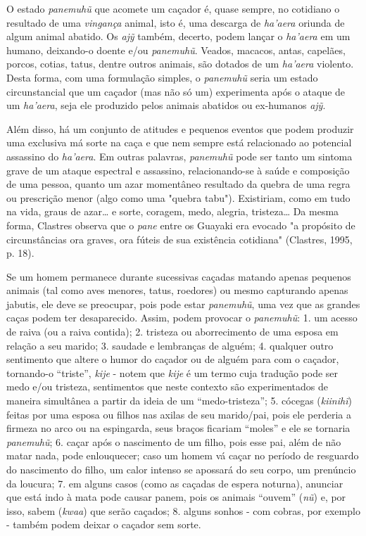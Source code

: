O estado \emph{panemuhũ} que acomete um caçador é, quase sempre, no
cotidiano o resultado de uma \emph{vingança} animal, isto é, uma
descarga de \emph{ha'aera} oriunda de algum animal abatido. Os
\emph{ajỹ} também, decerto, podem lançar o \emph{ha'aera} em um humano,
deixando-o doente e/ou \emph{panemuhũ}. Veados, macacos, antas,
capelães, porcos, cotias, tatus, dentre outros animais, são dotados de
um \emph{ha'aera} violento. Desta forma, com uma formulação simples, o
\emph{panemuhũ} seria um estado circunstancial que um caçador (mas não
só um) experimenta após o ataque de um \emph{ha'aera}, seja ele
produzido pelos animais abatidos ou ex-humanos \emph{ajỹ}.

Além disso, há um conjunto de atitudes e pequenos eventos que podem
produzir uma exclusiva má sorte na caça e que nem sempre está
relacionado ao potencial assassino do \emph{ha'aera}. Em outras
palavras, \emph{panemuhũ} pode ser tanto um sintoma grave de um ataque
espectral e assassino, relacionando-se à saúde e composição de uma
pessoa, quanto um azar momentâneo resultado da quebra de uma regra ou
prescrição menor (algo como uma "quebra tabu"). Existiriam, como em tudo
na vida, graus de azar\ldots{} e sorte, coragem, medo, alegria, tristeza\ldots{}
Da mesma forma, Clastres observa que o \emph{pane} entre os Guayaki era
evocado "a propósito de circunstâncias ora graves, ora fúteis de sua
existência cotidiana" (Clastres, 1995, p. 18).

Se um homem permanece durante sucessivas caçadas matando apenas pequenos
animais (tal como aves menores, tatus, roedores) ou mesmo capturando
apenas jabutis, ele deve se preocupar, pois pode estar \emph{panemuhũ},
uma vez que as grandes caças podem ter desaparecido. Assim, podem
provocar o \emph{panemuhũ}: 1. um acesso de raiva (ou a raiva contida);
2. tristeza ou aborrecimento de uma esposa em relação a seu marido; 3.
saudade e lembranças de alguém; 4. qualquer outro sentimento que altere
o humor do caçador ou de alguém para com o caçador, tornando-o
``triste'', \emph{kije} - notem que \emph{kije} é um termo cuja tradução
pode ser medo e/ou tristeza, sentimentos que neste contexto são
experimentados de maneira simultânea a partir da ideia de um
``medo-tristeza''; 5. cócegas (\emph{kiinihĩ}) feitas por uma esposa ou
filhos nas axilas de seu marido/pai, pois ele perderia a firmeza no arco
ou na espingarda, seus braços ficariam ``moles'' e ele se tornaria
\emph{panemuhũ}; 6. caçar após o nascimento de um filho, pois esse pai,
além de não matar nada, pode enlouquecer; caso um homem vá caçar no
período de resguardo do nascimento do filho, um calor intenso se
apossará do seu corpo, um prenúncio da loucura; 7. em alguns casos (como
as caçadas de espera noturna), anunciar que está indo à mata pode causar
panem, pois os animais ``ouvem'' (\emph{nũ}) e, por isso, sabem
(\emph{kwaa}) que serão caçados; 8. alguns sonhos - com cobras, por
exemplo - também podem deixar o caçador sem sorte.

